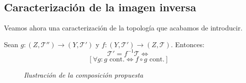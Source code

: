 \subsection{Caracterización de la imagen inversa}
\label{sub:caracterizacion_de_la_imagen_inversa}
Veamos ahora una caracterización de la topología que acabamos de introducir.
\begin{theo}
Sean $g: \left( Z, \mathcal{T}'' \right) \rightarrow \left( Y, \mathcal{T}' \right)$ y $f: \left( Y, \mathcal{T}' \right) \rightarrow \left( Z, \mathcal{T} \right)$. Entonces:
    \[
    \mathcal{T}' = f^{-1}\mathcal{T} \Leftrightarrow  
    \]
    \begin{equation}\label{ec:prop_universal_inm}
        \left[\forall g: g \text{ cont.} \Leftrightarrow f \circ g \text{ cont.} \right]  
    \end{equation}

    \begin{figure}[H]
        \centering    
        \caption{\textit{Ilustración de la composición propuesta}}
        \label{prop_universal_inmersiones}
    \end{figure}
\end{theo}
